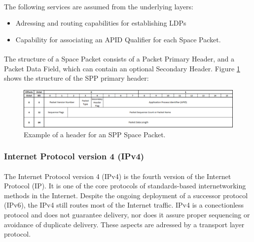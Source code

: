 \paragraph{}The following services are assumed from the underlying layers:
\begin{itemize}
\item Adressing and routing capabilities for establishing LDPs
\item Capability for associating an APID Qualifier for each Space Packet.
\end{itemize}
\paragraph{}The structure of a Space Packet consists of a Packet Primary Header, and a Packet Data Field, which can contain an optional Secondary Header. Figure \ref{fig:SPPheader} shows the structure of the SPP primary header:
\begin{figure}[H]
\begin{center}
\includegraphics[scale=0.5]{SPP_header.PNG}
\caption[SPP header]{Example of a header for an SPP Space Packet.}
\label{fig:SPPheader}
\end{center}
\end{figure}

\subsubsection*{Internet Protocol version 4 (IPv4)\cite{IP}}
\paragraph{}The Internet Protocol version 4 (IPv4) is the fourth version of the Internet Protocol (IP). It is one of the core protocols of standards-based internetworking methods in the Internet. Despite the ongoing deployment of a successor protocol (IPv6), the IPv4 still routes most of the Internet traffic. IPv4 is a conectionless protocol and does not guarantee delivery, nor does it assure proper sequencing or avoidance of duplicate delivery. These aspects are adressed by a transport layer protocol.
